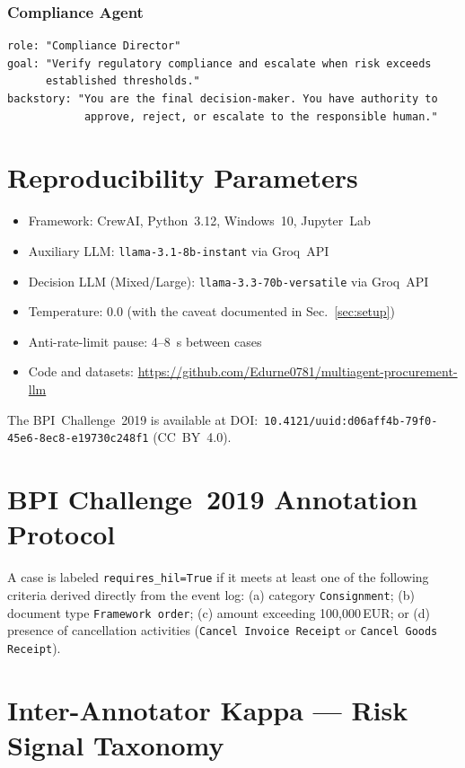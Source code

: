 \documentclass[preprint,12pt,numrefs]{elsarticle}
\begin{document}
\subsubsection*{Compliance Agent}
\begin{lstlisting}[language={}, numbers=none]
role: "Compliance Director"
goal: "Verify regulatory compliance and escalate when risk exceeds
      established thresholds."
backstory: "You are the final decision-maker. You have authority to
            approve, reject, or escalate to the responsible human."
\end{lstlisting}

\section{Reproducibility Parameters}
\label{app:reproducibility}

\begin{itemize}
  \item Framework: CrewAI, Python~3.12, Windows~10, Jupyter~Lab
  \item Auxiliary LLM: \texttt{llama-3.1-8b-instant} via Groq~API
  \item Decision LLM (Mixed/Large): \texttt{llama-3.3-70b-versatile} via Groq~API
  \item Temperature: 0.0 (with the caveat documented in Sec.~\ref{sec:setup})
  \item Anti-rate-limit pause: 4--8~s between cases
  \item Code and datasets: \url{https://github.com/Edurne0781/multiagent-procurement-llm}
\end{itemize}

The BPI~Challenge~2019 is available at
DOI:~\texttt{10.4121/uuid:d06aff4b-79f0-45e6-8ec8-e19730c248f1}
(CC~BY~4.0).

\section{BPI Challenge~2019 Annotation Protocol}
\label{app:bpi_protocolo}

A case is labeled \texttt{requires\_hil=True} if it meets at least one
of the following criteria derived directly from the event log:
(a) category \texttt{Consignment}; (b) document type
\texttt{Framework order}; (c) amount exceeding 100,000\,EUR; or
(d) presence of cancellation activities (\texttt{Cancel Invoice
Receipt} or \texttt{Cancel Goods Receipt}).

\section{Inter-Annotator Kappa --- Risk Signal Taxonomy}
\label{app:kappa_matrix}
\end{document}
